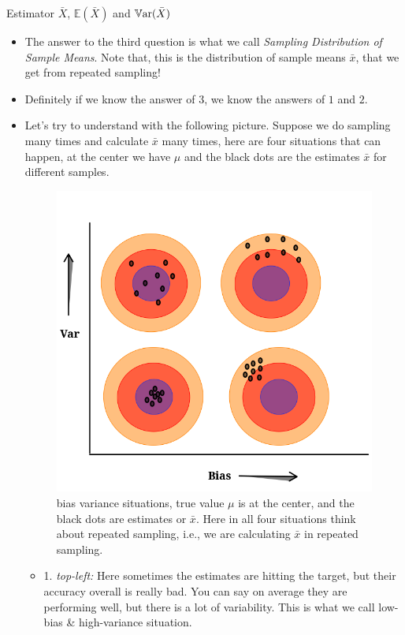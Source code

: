 \documentclass[8pt, usepdftitle=false]{beamer}
\begin{document}
\begin{frame}[allowframebreaks]{Estimator $\bar{X}$, $\mathbb{E}(\bar{X})$ and $\mathbb{V}\mathrm{ar}{(}\bar{X})$}
\begin{itemize}
  \item The answer to the third question is what we call \emph{Sampling Distribution of Sample Means}. Note that, this is the distribution of sample means $\bar{x}$, that we get from repeated sampling!


  \item Definitely if we know the answer of $3$, we know the answers of $1$ and $2$.

  \item Let's try to understand with the following picture. Suppose we do sampling many times and calculate $\bar{x}$ many times, here are four situations that can happen, at the center we have $\mu$ and the black dots are the estimates $\bar{x}$ for different samples.


\framebreak

\begin{figure}
\centering
\includegraphics[scale  = .2]{Images/Dart_bias_var.png}
\caption{bias variance situations, true value $\mu$ is at the center, and the black dots are estimates or $\bar{x}$. Here in all four situations think about repeated sampling, i.e., we are calculating $\bar{x}$ in repeated sampling.}
\vspace*{-.4cm}
\end{figure}

\begin{itemize}
\item 1. \emph{top-left:} Here sometimes the estimates are hitting the target, but their accuracy overall is really bad. You can say on average they are performing well, but there is a lot of variability. This is what we call \alert{low-bias \& high-variance} situation.


\end{itemize}
\end{itemize}
\end{frame}
\end{document}
